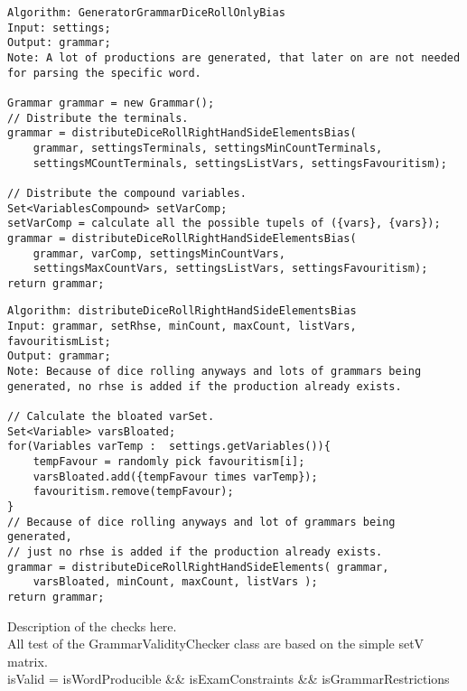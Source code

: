 \pagebreak

\lstset{language=java}
\begin{lstlisting}[frame=htrbl,caption={GeneratorGrammarDiceRollOnlyBias}, 
label={lst:GeneratorGrammarDiceRollOnlyBias}]
Algorithm: GeneratorGrammarDiceRollOnlyBias
Input: settings;
Output: grammar;
Note: A lot of productions are generated, that later on are not needed
for parsing the specific word.

Grammar grammar = new Grammar();
// Distribute the terminals.
grammar = distributeDiceRollRightHandSideElementsBias(
	grammar, settingsTerminals, settingsMinCountTerminals, 
	settingsMCountTerminals, settingsListVars, settingsFavouritism);

// Distribute the compound variables.
Set<VariablesCompound> setVarComp;
setVarComp = calculate all the possible tupels of ({vars}, {vars});
grammar = distributeDiceRollRightHandSideElementsBias(
	grammar, varComp, settingsMinCountVars,
	settingsMaxCountVars, settingsListVars, settingsFavouritism);
return grammar;
\end{lstlisting}

\lstset{language=java}
\begin{lstlisting}[frame=htrbl,caption={distributeDiceRollRightHandSideElementsBias}, 
label={lst:distributeDiceRollRightHandSideElementsBias}]
Algorithm: distributeDiceRollRightHandSideElementsBias
Input: grammar, setRhse, minCount, maxCount, listVars, favouritismList;
Output: grammar;
Note: Because of dice rolling anyways and lots of grammars being 
generated, no rhse is added if the production already exists.

// Calculate the bloated varSet.
Set<Variable> varsBloated;
for(Variables varTemp :  settings.getVariables()){
	tempFavour = randomly pick favouritism[i];
	varsBloated.add({tempFavour times varTemp});
	favouritism.remove(tempFavour);
}
// Because of dice rolling anyways and lot of grammars being generated, 
// just no rhse is added if the production already exists.
grammar = distributeDiceRollRightHandSideElements( grammar,
	varsBloated, minCount, maxCount, listVars );
return grammar;
\end{lstlisting}

\pagebreak
\noindent Description of the checks here. \\
\noindent All test of the GrammarValidityChecker class are based on the simple setV matrix. \\

\noindent  isValid = isWordProducible \&\& isExamConstraints \&\& isGrammarRestrictions\\

